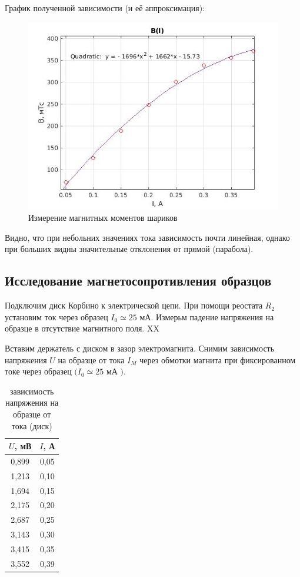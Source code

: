 \documentclass[a4paper, 12pt]{article}%
\begin{document}
График полученной зависимости (и её аппроксимация):

\begin{center}
\begin{figure}[h]
    \centering
    \includegraphics[width = 10 cm]{B(I).jpg}
    \caption{Измерение магнитных моментов шариков}
    \label{msh1}
\end{figure}
\end{center}

Видно, что при небольних значениях тока зависимость почти линейная, однако при больших видны значительные отклонения от прямой (парабола).


\subsection{Исследование магнетосопротивления образцов}

Подключим диск Корбино к электрической цепи. При помощи реостата $R_{2}$ установим ток через образец $I_{0} \simeq 25$ мА. Измерьм падение напряжения на образце в отсутствие магнитного поля. XX

Вставим держатель с диском в зазор электромагнита. Снимим зависимость напряжения $U$ на образце от тока $I_{M}$ через обмотки магнита при фиксированном токе через образец $(I_{0} \simeq 25$ мА $) .$

\begin{table}[!h]
\begin{center}
\begin{tabular}{|c|c|}
\hline $U$, мВ & $I$, А\\
\hline 0,899 & 0,05 \\
\hline 1,213 & 0,10 \\
\hline 1,694 & 0,15 \\
\hline 2,175 & 0,20 \\
\hline 2,687 & 0,25 \\
\hline 3,143 & 0,30 \\
\hline 3,415 & 0,35 \\
\hline 3,552 & 0,39 \\
\hline
\end{tabular}
\end{center}
\caption{зависимость напряжения на образце от тока (диск)}
\end{table}
\end{document}
